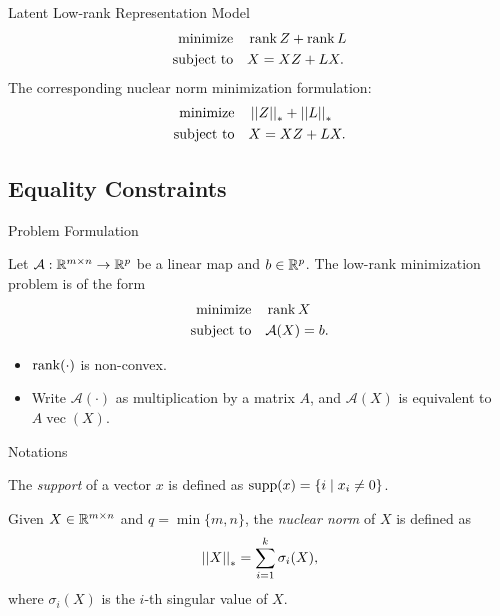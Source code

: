 \documentclass{beamer}
\begin{document}
\begin{frame}{Latent Low-rank Representation Model}
    \[\begin{aligned}
        \textnormal{minimize}\quad & \operatorname{rank} Z+\operatorname{rank} L\\
        \textnormal{subject to}\quad & X=XZ+LX.
    \end{aligned}\]
    \pause
    The corresponding nuclear norm minimization formulation:
    \[\begin{aligned}
        \textnormal{minimize}\quad & \left|\left|Z\right|\right|_\ast+\left|\left|L\right|\right|_\ast\\
        \textnormal{subject to}\quad & X=XZ+LX.
    \end{aligned}\]
\end{frame}

\subsection{Equality Constraints}

\begin{frame}{Problem Formulation}
    \begin{definition}
        Let \(\mathcal A:\mathbb R^{m\times n}\to\mathbb R^p\) be a linear map and \(b\in\mathbb R^p\). The low-rank minimization problem is of the form
        \[\begin{aligned}
            \textnormal{minimize}\quad & \operatorname{rank} X\\
            \textnormal{subject to}\quad & \mathcal A(X)=b.
        \end{aligned}\]
    \end{definition}
    \pause
    \begin{itemize}
        \item \(\operatorname{rank}(\cdot)\) is non-convex.
        \item Write \(\mathcal A(\cdot)\) as multiplication by a matrix \(A\), and \(\mathcal A(X)\) is equivalent to \(A\operatorname{vec}(X)\).
    \end{itemize}
\end{frame}

\begin{frame}{Notations}
    \begin{definition}[Support]
        The \emph{support} of a vector \(x\) is defined as \(\operatorname{supp}(x)=\left\{i\mid x_i\neq 0\right\}\).
    \end{definition}
    \begin{definition}
        Given \(X\in\mathbb R^{m\times n}\) and \(q=\min\{m,n\}\), the \emph{nuclear norm} of \(X\) is defined as
        \[\left|\left|X\right|\right|_\ast=\sum_{i=1}^k\sigma_i(X),\]
        where \(\sigma_i(X)\) is the \(i\)-th singular value of \(X\).
    \end{definition}
\end{frame}
\end{document}
